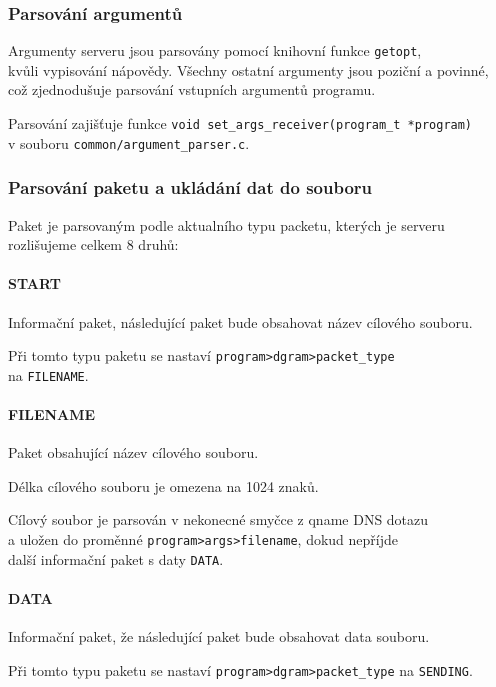 \subsubsection{Parsování argumentů} \label{sec:parsovani-argumentu-s}

Argumenty serveru jsou parsovány pomocí knihovní funkce \texttt{getopt}, \\
kvůli vypisování nápovědy. Všechny ostatní argumenty jsou poziční a povinné,
což zjednodušuje parsování vstupních argumentů programu.

Parsování zajišťuje funkce \texttt{void set\_args\_receiver(program\_t *program)} \\
v souboru \texttt{common/argument\_parser.c}.

\subsubsection{Parsování paketu a ukládání dat do souboru} \label{sec:vytvareni-paketu-s}
Paket je parsovaným podle aktualního typu packetu, kterých je serveru
rozlišujeme celkem 8 druhů:

\paragraph{START}
Informační paket, následující paket bude obsahovat název cílového souboru.

Při tomto typu paketu se nastaví \texttt{program\->dgram\->packet\_type} \\
na \texttt{FILENAME}.

\paragraph{FILENAME}
Paket obsahující název cílového souboru.

Délka cílového souboru je omezena na 1024 znaků.

Cílový soubor je parsován v nekonecné smyčce z qname DNS dotazu\\
a uložen do proměnné \texttt{program\->args\->filename}, dokud nepříjde\\
další informační paket s daty \texttt{DATA}.

\paragraph{DATA}
Informační paket, že následující paket bude obsahovat data souboru.

Při tomto typu paketu se nastaví \texttt{program\->dgram\->packet\_type} na \texttt{SENDING}.


